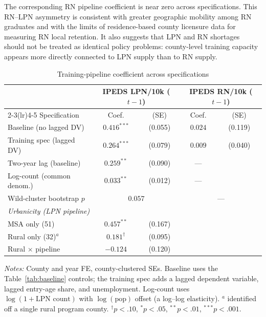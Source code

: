 \documentclass[12pt]{article}
\begin{document}
The corresponding RN pipeline coefficient is near zero across
specifications. This RN--LPN asymmetry is consistent with greater geographic
mobility among RN graduates and with the limits of residence-based county
licensure data for measuring RN local retention. It also suggests that LPN
and RN shortages should not be treated as identical policy problems:
county-level training capacity appears more directly connected to LPN
supply than to RN supply.

\begin{table}[!htbp]
\centering
\caption{Training-pipeline coefficient across specifications}
\label{tab:training}
\small
\begin{tabular}{lcccc}
\toprule
 & \multicolumn{2}{c}{IPEDS LPN/10k ($t-1$)} & \multicolumn{2}{c}{IPEDS RN/10k ($t-1$)} \\
\cmidrule(lr){2-3}\cmidrule(lr){4-5}
Specification & Coef. & (SE) & Coef. & (SE) \\
\midrule
Baseline (no lagged DV) & $0.416^{***}$ & (0.055) & $0.024$ & (0.119) \\
Training spec (lagged DV) & $0.264^{***}$ & (0.079) & $0.009$ & (0.040) \\
Two-year lag (baseline) & $0.259^{**}$ & (0.090) & --- &  \\
Log-count (common denom.) & $0.033^{**}$ & (0.012) & --- &  \\
\quad Wild-cluster bootstrap $p$ & \multicolumn{2}{c}{$0.057$} & \multicolumn{2}{c}{---} \\
\midrule
\multicolumn{5}{l}{\textit{Urbanicity (LPN pipeline)}} \\
\quad MSA only (51) & $0.457^{**}$ & (0.167) & & \\
\quad Rural only (32)$^{a}$ & $0.181^{\dagger}$ & (0.095) & & \\
\quad Rural $\times$ pipeline & $-0.124$ & (0.120) & & \\
\bottomrule
\end{tabular}
\par\medskip\footnotesize\textit{Notes:} County and year FE, county-clustered SEs. Baseline uses the Table~\ref{tab:baseline} controls; the training spec adds a lagged dependent variable, lagged entry-age share, and unemployment. Log-count uses $\log(1+\text{LPN count})$ with $\log(\text{pop})$ offset (a log--log elasticity). $^{a}$ identified off a single rural program county. $^{\dagger}p<.10$, $^{*}p<.05$, $^{**}p<.01$, $^{***}p<.001$.
\end{table}
\end{document}
